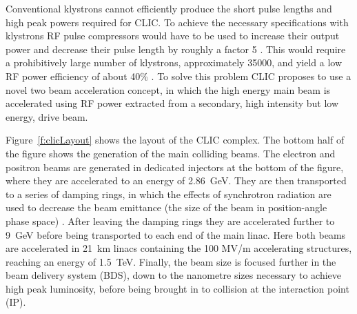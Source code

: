 
Conventional klystrons cannot efficiently produce the short pulse lengths and high peak powers required for CLIC. To achieve the necessary specifications with klystrons RF pulse compressors would have to be used to increase their output power and decrease their pulse length by roughly a factor 5 \cite{clicCDR}. This would require a prohibitively large number of klystrons, approximately 35000, and yield a low RF power efficiency of about 40\% \cite{clicCDR}. To solve this problem CLIC proposes to use a novel two beam acceleration concept, in which the high energy main beam is accelerated using RF power extracted from a secondary, high intensity but low energy, drive beam.

Figure~\ref{f:clicLayout} shows the layout of the CLIC complex. The bottom half of the figure shows the generation of the main colliding beams. The electron and positron beams are generated in dedicated injectors at the bottom of the figure, where they are accelerated to an energy of 2.86~GeV. They are then transported to a series of damping rings, in which the effects of synchrotron radiation are used to decrease the beam emittance (the size of the beam in position-angle phase space) \cite{dampRings}. After leaving the damping rings they are accelerated further to 9~GeV before being transported to each end of the main linac. Here both beams are accelerated in 21~km linacs containing the 100 MV/m accelerating structures, reaching an energy of 1.5~TeV. Finally, the beam size is focused further in the beam delivery system (BDS), down to the nanometre sizes necessary to achieve high peak luminosity, before being brought in to collision at the interaction point (IP).

